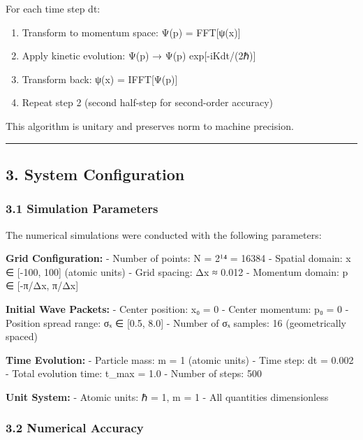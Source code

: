 \documentclass[
  11pt,
]{article}
\providecommand{\tightlist}{%
  \setlength{\itemsep}{0pt}\setlength{\parskip}{0pt}}
\begin{document}
For each time step dt:

\begin{enumerate}
\def\labelenumi{\arabic{enumi}.}
\tightlist
\item
  Transform to momentum space: Ψ(p) = FFT{[}ψ(x){]}
\item
  Apply kinetic evolution: Ψ(p) → Ψ(p) exp{[}-iKdt/(2ℏ){]}
\item
  Transform back: ψ(x) = IFFT{[}Ψ(p){]}
\item
  Repeat step 2 (second half-step for second-order accuracy)
\end{enumerate}

This algorithm is unitary and preserves norm to machine precision.

\begin{center}\rule{0.5\linewidth}{0.5pt}\end{center}

\subsection{3. System Configuration}\label{system-configuration}

\subsubsection{3.1 Simulation Parameters}\label{simulation-parameters}

The numerical simulations were conducted with the following parameters:

\textbf{Grid Configuration:} - Number of points: N = 2¹⁴ = 16384 -
Spatial domain: x ∈ {[}-100, 100{]} (atomic units) - Grid spacing: Δx ≈
0.012 - Momentum domain: p ∈ {[}-π/Δx, π/Δx{]}

\textbf{Initial Wave Packets:} - Center position: x₀ = 0 - Center
momentum: p₀ = 0 - Position spread range: σₓ ∈ {[}0.5, 8.0{]} - Number
of σₓ samples: 16 (geometrically spaced)

\textbf{Time Evolution:} - Particle mass: m = 1 (atomic units) - Time
step: dt = 0.002 - Total evolution time: t\_max = 1.0 - Number of steps:
500

\textbf{Unit System:} - Atomic units: ℏ = 1, m = 1 - All quantities
dimensionless

\subsubsection{3.2 Numerical Accuracy}\label{numerical-accuracy}
\end{document}
